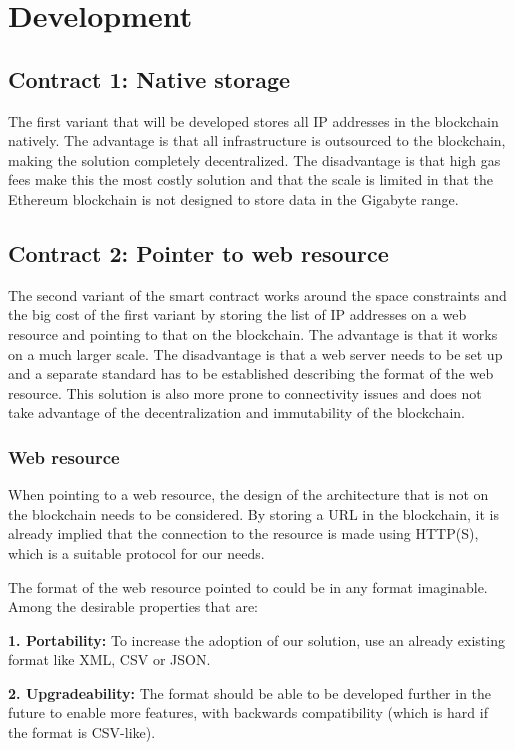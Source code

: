 \chapter{Development}

\section{Contract 1: Native storage}
The first variant that will be developed stores all IP addresses in the blockchain natively. The advantage is that all infrastructure is outsourced to the blockchain, making the solution completely decentralized. The disadvantage is that high gas fees make this the most costly solution and that the scale is limited in that the Ethereum blockchain is not designed to store data in the Gigabyte range.

\section{Contract 2: Pointer to web resource}
The second variant of the smart contract works around the space constraints and the big cost of the first variant by storing the list of IP addresses on a web resource and pointing to that on the blockchain. The advantage is that it works on a much larger scale. The disadvantage is that a web server needs to be set up and a separate standard has to be established describing the format of the web resource. This solution is also more prone to connectivity issues and does not take advantage of the decentralization and immutability of the blockchain.

\subsection{Web resource}
When pointing to a web resource, the design of the architecture that is not on the blockchain needs to be considered. By storing a URL in the blockchain, it is already implied that the connection to the resource is made using HTTP(S), which is a suitable protocol for our needs.

The format of the web resource pointed to could be in any format imaginable. Among the desirable properties that are:

\textbf{1. Portability:} To increase the adoption of our solution, use an already existing format like XML, CSV or JSON.

\textbf{2. Upgradeability:} The format should be able to be developed further in the future to enable more features, with backwards compatibility (which is hard if the format is CSV-like).

